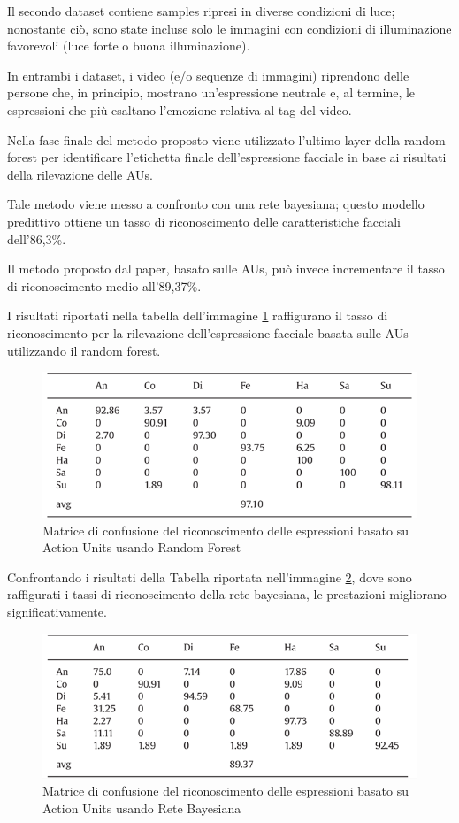 Il secondo dataset contiene samples ripresi in diverse condizioni di luce; nonostante ciò, sono state incluse solo le immagini con condizioni di illuminazione favorevoli (luce forte o buona illuminazione).

In entrambi i dataset, i video (e/o sequenze di immagini) riprendono delle persone che, in principio, mostrano un’espressione neutrale e, al termine, le espressioni che più esaltano l’emozione relativa al tag del video.

Nella fase finale del metodo proposto viene utilizzato l’ultimo layer della random forest per identificare l'etichetta finale dell'espressione facciale in base ai risultati della rilevazione delle AUs. 

Tale metodo viene messo a confronto con una rete bayesiana; questo modello predittivo ottiene un tasso di riconoscimento delle caratteristiche facciali dell’86,3\%. 

Il metodo proposto dal paper, basato sulle AUs, può invece incrementare il tasso di riconoscimento medio all’89,37\%. 

I risultati riportati nella tabella dell’immagine \ref{fig:image2} raffigurano il tasso di riconoscimento per la rilevazione dell'espressione facciale basata sulle AUs utilizzando il random forest. 
\begin{figure}
    \begin{center}    
        \includegraphics[width=0.7\linewidth]{images/15.png}
        \caption{Matrice di confusione del riconoscimento delle espressioni basato su Action Units usando Random Forest}
        \label{fig:image2}
    \end{center}
\end{figure}

Confrontando i risultati della Tabella riportata nell’immagine \ref{fig:image3}, dove sono raffigurati i tassi di riconoscimento della rete bayesiana, le prestazioni migliorano significativamente. 
\begin{figure}
    \begin{center}    
        \includegraphics[width=0.7\linewidth]{images/16.png}
        \caption{Matrice di confusione del riconoscimento delle espressioni basato su Action Units usando Rete Bayesiana}
        \label{fig:image3}
    \end{center}
\end{figure}

